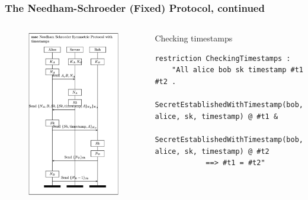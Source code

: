 \documentclass[aspectratio=169,t,xcolor=table]{beamer}
\begin{document}
\begin{frame}[fragile]
    \frametitle{The Needham-Schroeder (Fixed) Protocol, continued}
    \begin{columns}
        \begin{figure}
            \centering
            \includegraphics[width=.8\textwidth]{images/NS_Fixed.png}
        \end{figure}
        \begin{block}{Checking timestamps}
            \begin{lstlisting}[language=Tamarin]
restriction CheckingTimestamps :
    "All alice bob sk timestamp #t1 #t2 .
        SecretEstablishedWithTimestamp(bob, alice, sk, timestamp) @ #t1 &
        SecretEstablishedWithTimestamp(bob, alice, sk, timestamp) @ #t2
            ==> #t1 = #t2"\end{lstlisting}
        \end{block}
    \end{columns}
\end{frame}
\end{document}

